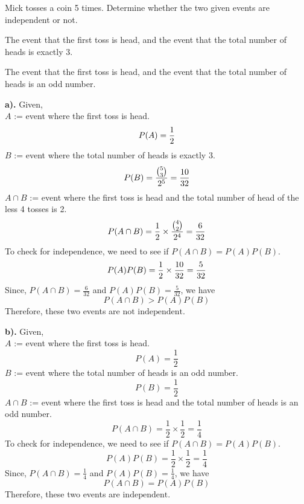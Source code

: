 \documentclass[a4paper, 10pt]{article}
\begin{document}
\pagebreak


\begin{problem}
Mick tosses a coin 5 times.
Determine whether the two given events are independent or not.
\begin{subproblems}
    \item The event that the first toss is head, and the event that the total number of heads is exactly 3.
    \item The event that the first toss is head, and the event that the total number of heads is an odd number.
\end{subproblems}
\end{problem}

\begin{solution}
\par\noindent\textbf{a).} Given, \\
\( A \) := event where the first toss is head.
\[
    P(A) = \frac{1}{2} \\
\]
\( B \) := event where the total number of heads is exactly 3.
\[
    P(B) = \frac{\binom{5}{3}}{2^5} = \frac{10}{32} \\
\]
\( A \cap B \) := event where the first toss is head and the total number of head of the less 4 tosses is 2.
\[
    P(A \cap B) = \frac{1}{2} \times \frac{\binom{4}{2}}{2^4} = \frac{6}{32} \\
\]
To check for independence, we need to see if \( P(A \cap B) = P(A)P(B) \).
\[
    P(A)P(B) = \frac{1}{2} \times \frac{10}{32} = \frac{5}{32} \\
\]
Since, \( P(A \cap B) = \frac{6}{32} \) and \( P(A)P(B) = \frac{5}{32} \), we have
\[
    P(A \cap B) > P(A)P(B)
\]
Therefore, these two events are \( \boxed{\text{not independent}} \).
\\
\par\noindent\textbf{b).} Given, \\
\( A \) := event where the first toss is head.
\[
    P(A) = \frac{1}{2}
\]
\( B \) := event where the total number of heads is an odd number.
\[
    P(B) = \frac{1}{2}
\]
\( A \cap B \) := event where the first toss is head and the total number of heads is an odd number.
\[
    P(A \cap B) = \frac{1}{2} \times \frac{1}{2} = \frac{1}{4}
\]
To check for independence, we need to see if \( P(A \cap B) = P(A)P(B) \).
\[
    P(A)P(B) = \frac{1}{2} \times \frac{1}{2} = \frac{1}{4}
\]
Since, \( P(A \cap B) = \frac{1}{4} \) and \( P(A)P(B) = \frac{1}{4} \), we have
\[
    P(A \cap B) = P(A)P(B)
\]
Therefore, these two events are \( \boxed{\text{independent}} \).

\end{solution}
\end{document}
